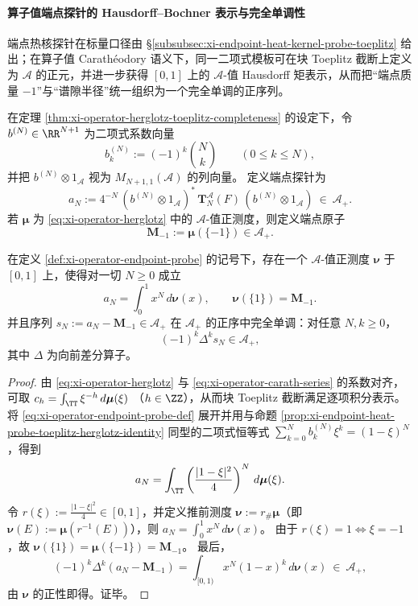 \paragraph{算子值端点探针的 Hausdorff--Bochner 表示与完全单调性}
端点热核探针在标量口径由 \S\ref{subsubsec:xi-endpoint-heat-kernel-probe-toeplitz} 给出；在算子值 Carath\'eodory 语义下，同一二项式模板可在块 Toeplitz 截断上定义为 \(\mathcal{A}\) 的正元，并进一步获得 \([0,1]\) 上的 \(\mathcal{A}\)-值 Hausdorff 矩表示，从而把“端点质量 \(-1\)”与“谱隙半径”统一组织为一个完全单调的正序列。

\begin{definition}\label{def:xi-operator-endpoint-probe}
在定理 \ref{thm:xi-operator-herglotz-toeplitz-completeness} 的设定下，令 \(b^{(N)}\in\RR^{N+1}\) 为二项式系数向量
\[
b^{(N)}_k:=(-1)^k\binom{N}{k}\qquad(0\le k\le N),
\]
并把 \(b^{(N)}\otimes 1_{\mathcal{A}}\) 视为 \(M_{N+1,1}(\mathcal{A})\) 的列向量。
定义端点探针为
\begin{equation}\label{eq:xi-operator-endpoint-probe-def}
\boxed{\;
a_N:=4^{-N}\,(b^{(N)}\otimes 1_{\mathcal{A}})^\ast\,\mathbf{T}^{\mathcal{A}}_N(F)\,(b^{(N)}\otimes 1_{\mathcal{A}})\ \in\ \mathcal{A}_+.\;}
\end{equation}
若 \(\boldsymbol\mu\) 为 \eqref{eq:xi-operator-herglotz} 中的 \(\mathcal{A}\)-值正测度，则定义端点原子
\[
\mathbf{M}_{-1}:=\boldsymbol\mu(\{-1\})\in\mathcal{A}_+.
\]
\end{definition}

\begin{theorem}\label{thm:xi-operator-endpoint-probe-hausdorff-bochner-complete-monotone}
在定义 \ref{def:xi-operator-endpoint-probe} 的记号下，存在一个 \(\mathcal{A}\)-值正测度 \(\boldsymbol\nu\) 于 \([0,1]\) 上，使得对一切 \(N\ge 0\) 成立
\[
\boxed{\;
a_N=\int_{0}^{1}x^{N}\,d\boldsymbol\nu(x),\qquad
\boldsymbol\nu(\{1\})=\mathbf{M}_{-1}.\;}
\]
并且序列 \(s_N:=a_N-\mathbf{M}_{-1}\in\mathcal{A}_+\) 在 \(\mathcal{A}_+\) 的正序中完全单调：对任意 \(N,k\ge 0\)，
\[
\boxed{\;(-1)^k\Delta^k s_N\in\mathcal{A}_+,\;}
\]
其中 \(\Delta\) 为向前差分算子。
\end{theorem}
\begin{proof}
由 \eqref{eq:xi-operator-herglotz} 与 \eqref{eq:xi-operator-carath-series} 的系数对齐，可取
\(
c_h=\int_{\TT}\xi^{-h}\,d\boldsymbol\mu(\xi)
\)
（\(h\in\ZZ\)），从而块 Toeplitz 截断满足逐项积分表示。
将 \eqref{eq:xi-operator-endpoint-probe-def} 展开并用与命题 \ref{prop:xi-endpoint-heat-probe-toeplitz-herglotz-identity} 同型的二项式恒等式
\(
\sum_{k=0}^{N}b^{(N)}_k\xi^{k}=(1-\xi)^N
\)，得到
\[
a_N=\int_{\TT}\left(\frac{|1-\xi|^{2}}{4}\right)^{N}\,d\boldsymbol\mu(\xi).
\]
令 \(r(\xi):=\frac{|1-\xi|^2}{4}\in[0,1]\)，并定义推前测度 \(\boldsymbol\nu:=r_\#\boldsymbol\mu\)（即 \(\boldsymbol\nu(E):=\boldsymbol\mu(r^{-1}(E))\)），则
\(
a_N=\int_{0}^{1}x^N\,d\boldsymbol\nu(x)
\)。
由于 \(r(\xi)=1\iff \xi=-1\)，故 \(\boldsymbol\nu(\{1\})=\boldsymbol\mu(\{-1\})=\mathbf{M}_{-1}\)。
最后，
\[
(-1)^k\Delta^k(a_N-\mathbf{M}_{-1})
=\int_{[0,1)}x^{N}(1-x)^{k}\,d\boldsymbol\nu(x)\ \in\ \mathcal{A}_+,
\]
由 \(\boldsymbol\nu\) 的正性即得。证毕。
\end{proof}

